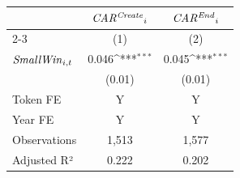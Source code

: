{
\def\sym#1{\ifmmode^{#1}\else\(^{#1}\)\fi}
\begin{tabular}{l*{2}{c}}
\toprule
                    &\multicolumn{1}{c}{${\it CAR^{\it Create}}_i$}&\multicolumn{1}{c}{${\it CAR^{\it End}}_i$}\\
\cmidrule(lr){2-3} & \multicolumn{1}{c}{(1)} & \multicolumn{1}{c}{(2)} \\ \midrule
${\it Small Win}_{i,t}$&       0.046\sym{***}&       0.045\sym{***}\\
                    &      (0.01)         &      (0.01)         \\
\midrule
Token FE            &           Y         &           Y         \\
Year FE             &           Y         &           Y         \\
Observations        &       1,513         &       1,577         \\
Adjusted R²         &       0.222         &       0.202         \\
\bottomrule
\end{tabular}
}
